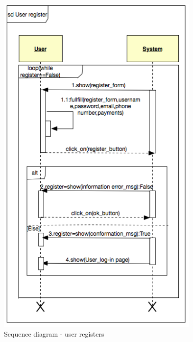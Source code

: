 \documentclass[12pt, letterpaper]{article}
\begin{document}
\begin{figure}[H]
\centering
\includegraphics[width=10cm]{userreg.png}
\caption{Sequence diagram - user registers}
\end{figure}
\end{document}
